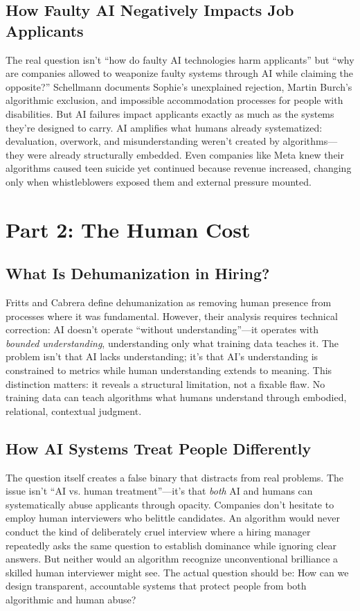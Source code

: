 \documentclass[11pt,twoside]{article}
\begin{document}
\subsection{How Faulty AI Negatively Impacts Job Applicants}

The real question isn't \enquote{how do faulty AI technologies harm applicants} but \enquote{why are companies allowed to weaponize faulty systems through AI while claiming the opposite?} Schellmann documents Sophie's unexplained rejection, Martin Burch's algorithmic exclusion, and impossible accommodation processes for people with disabilities. But AI failures impact applicants exactly as much as the systems they're designed to carry. AI amplifies what humans already systematized: devaluation, overwork, and misunderstanding weren't created by algorithms—they were already structurally embedded. Even companies like Meta knew their algorithms caused teen suicide yet continued because revenue increased, changing only when whistleblowers exposed them and external pressure mounted.

\section{Part 2: The Human Cost}

\subsection{What Is Dehumanization in Hiring?}

Fritts and Cabrera define dehumanization as removing human presence from processes where it was fundamental. However, their analysis requires technical correction: AI doesn't operate \enquote{without understanding}—it operates with \textit{bounded understanding}, understanding only what training data teaches it. The problem isn't that AI lacks understanding; it's that AI's understanding is constrained to metrics while human understanding extends to meaning. This distinction matters: it reveals a structural limitation, not a fixable flaw. No training data can teach algorithms what humans understand through embodied, relational, contextual judgment.

\subsection{How AI Systems Treat People Differently}

The question itself creates a false binary that distracts from real problems. The issue isn't \enquote{AI vs. human treatment}—it's that \textit{both} AI and humans can systematically abuse applicants through opacity. Companies don't hesitate to employ human interviewers who belittle candidates. An algorithm would never conduct the kind of deliberately cruel interview where a hiring manager repeatedly asks the same question to establish dominance while ignoring clear answers. But neither would an algorithm recognize unconventional brilliance a skilled human interviewer might see. The actual question should be: How can we design transparent, accountable systems that protect people from both algorithmic and human abuse?
\end{document}

